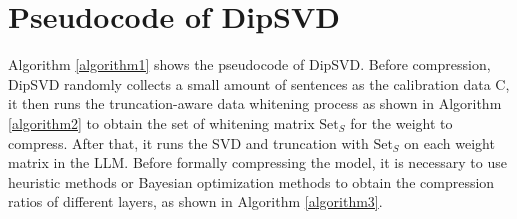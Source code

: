 \documentclass[11pt]{article}
\begin{document}

%


\appendix

\section{Pseudocode of DipSVD}

Algorithm \ref{algorithm1} shows the pseudocode of DipSVD. Before compression, DipSVD randomly collects a small amount of sentences as the calibration data C, it then runs the truncation-aware data whitening process as shown in Algorithm \ref{algorithm2} to obtain the set of whitening matrix  $\text{Set}_S$ for the weight to compress. After that, it runs the SVD and truncation with $\text{Set}_S$ on each weight matrix in the LLM. Before formally compressing the model, it is necessary to use heuristic methods or Bayesian optimization methods to obtain the compression ratios of different layers, as shown in Algorithm \ref{algorithm3}.
\end{document}
